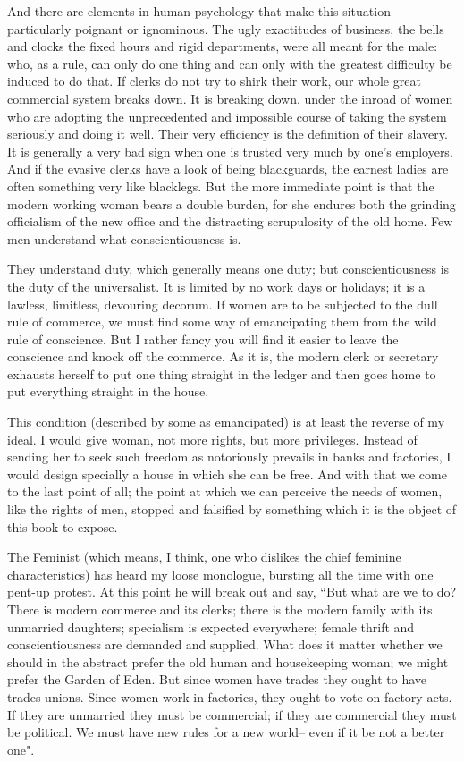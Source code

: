 \documentclass[final,10pt,letterpaper,twocolumn,openany]{book}
\begin{document}
And there are elements in human psychology that make this
situation particularly poignant or ignominous. The ugly exactitudes of
business, the bells and clocks the fixed hours and rigid departments, were
all meant for the male: who, as a rule, can only do one thing and can only
with the greatest difficulty be induced to do that. If clerks do not try to
shirk their work, our whole great commercial system breaks down. It is
breaking down, under the inroad of women who are adopting the
unprecedented and impossible course of taking the system seriously and
doing it well. Their very efficiency is the definition of their slavery. It is
generally a very bad sign when one is trusted very much by one's
employers. And if the evasive clerks have a look of being blackguards, the
earnest ladies are often something very like blacklegs. But the more
immediate point is that the modern working woman bears a double burden,
for she endures both the grinding officialism of the new office and the
distracting scrupulosity of the old home. Few men understand what
conscientiousness is. 

They understand duty, which generally means one
duty; but conscientiousness is the duty of the universalist. It is limited by
no work days or holidays; it is a lawless, limitless, devouring decorum. If
women are to be subjected to the dull rule of commerce, we must find
some way of emancipating them from the wild rule of conscience. But I
rather fancy you will find it easier to leave the conscience and knock off
the commerce. As it is, the modern clerk or secretary exhausts herself to
put one thing straight in the ledger and then goes home to put everything
straight in the house.

This condition (described by some as emancipated) is at least the
reverse of my ideal. I would give woman, not more rights, but more
privileges. Instead of sending her to seek such freedom as notoriously
prevails in banks and factories, I would design specially a house in which
she can be free. And with that we come to the last point of all; the point at
which we can perceive the needs of women, like the rights of men,
stopped and falsified by something which it is the object of this book to
expose.

The Feminist (which means, I think, one who dislikes the chief
feminine characteristics) has heard my loose monologue, bursting all the
time with one pent-up protest. At this point he will break out and say, ``But
what are we to do? There is modern commerce and its clerks; there is the
modern family with its unmarried daughters; specialism is expected
everywhere; female thrift and conscientiousness are demanded and
supplied. What does it matter whether we should in the abstract prefer the
old human and housekeeping woman; we might prefer the Garden of Eden.
But since women have trades they ought to have trades unions. Since
women work in factories, they ought to vote on factory-acts. If they are
unmarried they must be commercial; if they are commercial they must be
political. We must have new rules for a new world-- even if it be not a
better one".
\end{document}
